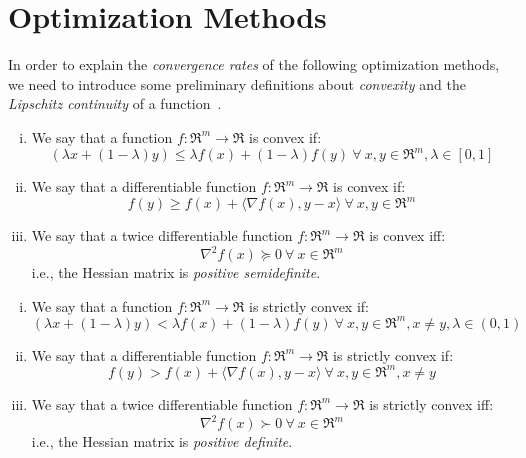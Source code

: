 
\section{Optimization Methods}

In order to explain the \emph{convergence rates} of the following optimization methods, we need to introduce some preliminary definitions about \emph{convexity} and the \emph{Lipschitz continuity} of a function~\cite{boyd2004convex}.

\begin{definition}[Convexity] \label{def:convexity}
	\hfill
	\begin{enumerate}[(i)]
		\item We say that a function $f: \Re^m \rightarrow \Re$ is convex if: 
		$$ 
			(\lambda x + (1 - \lambda) y ) \leq \lambda f(x) + (1 - \lambda) f(y) \ \forall \ x, y \in \Re^m, \lambda \in [0,1] 
		$$
		\item We say that a differentiable function $f: \Re^m \rightarrow \Re$ is convex if: 
		$$ 
			f(y) \geq f(x) + \langle \nabla f(x), y - x \rangle \ \forall \ x, y \in \Re^m 
		$$
		\item We say that a twice differentiable function $f: \Re^m \rightarrow \Re$ is convex iff: 
		$$ 
			\nabla^2 f(x) \succeq 0 \ \forall \ x \in \Re^m 
		$$ i.e., the Hessian matrix is \emph{positive semidefinite}.
	\end{enumerate}
\end{definition}

\begin{definition} \label{def:strict_convexity}
	\hfill
	\begin{enumerate}[(i)]
		\item We say that a function $f: \Re^m \rightarrow \Re$ is strictly convex if: 
		$$ 
			(\lambda x + (1 - \lambda) y ) < \lambda f(x) + (1 - \lambda) f(y) \ \forall \ x, y \in \Re^m, x \neq y, \lambda \in (0,1) 
		$$
		\item We say that a differentiable function $f: \Re^m \rightarrow \Re$ is strictly convex if: 
		$$ 
			f(y) > f(x) + \langle \nabla f(x), y - x \rangle \ \forall \ x, y \in \Re^m, x \neq y
		$$
		\item We say that a twice differentiable function $f: \Re^m \rightarrow \Re$ is strictly convex iff: 
		$$ 
			\nabla^2 f(x) \succ 0 \ \forall \ x \in \Re^m 
		$$ i.e., the Hessian matrix is \emph{positive definite}.
	\end{enumerate}
\end{definition}

